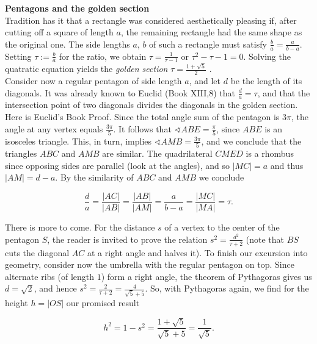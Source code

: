 \begin{mdframed}[nobreak=true, backgroundcolor=gray!15]
\vspace{8pt}
{\Large\textbf{Pentagons and the golden section}}\\
[5pt]
Tradition has it that a rectangle was considered aesthetically pleasing 
if, after cutting off a square of length $a$, the remaining rectangle had 
the same shape as the original one. The side lengths $a$, $b$  of such a
rectangle must satisfy $\frac{b}{a}= \frac{a}{b-a}$. Setting $\tau := \frac{b}{a}$
for the ratio, we obtain $\tau = \frac{1}{\tau-1}$ or $\tau^2 - \tau - 1 = 0$. Solving
the quatratic equation yields the \textit{golden section} $\tau = \frac{1 + \sqrt{5}}{2}$ .\\

Consider now a regular pentagon of side length $a$, and let $d$ be the 
length of its diagonals. It was already known to Euclid (Book XIII,8) 
that $\frac{d}{a} = \tau$, and that the intersection point of two diagonals divides 
the diagonals in the golden section.\\

Here is Euclid's Book Proof. Since the total angle sum of the pentagon 
is $3\pi$, the angle at any vertex equals $\frac{3\pi}{5}$. It follows that 
$\sphericalangle ABE = \frac{\pi}{5}$, since $ABE$ is an isosceles triangle. This, in turn, 
implies $\sphericalangle AMB = \frac{3\pi}{5}$, and we conclude that the triangles $ABC$ and 
$AMB$ are similar. The quadrilateral $CMED$  is a rhombus since opposing sides are
parallel (look at the angles), and so $|MC| = a$ and thus $|AM| = d - a$. By the similarity of 
$ABC$ and $AMB$ we conclude

\begin{equation*}
  \frac{d}{a} = \frac{|AC|}{|AB|} = \frac{|AB|}{|AM|} = \frac{a}{b-a} = \frac{|MC|}{|MA|} = \tau.
\end{equation*}

There is more to come. For the distance $s$ of a vertex to the center of 
the pentagon $S$,  the reader is invited to prove the relation $s^2 = \frac{d^2}{\tau + 2}$ 
(note that $BS$ cuts the diagonal $AC$ at a right angle and halves it). 
To finish our excursion into geometry, consider now the umbrella 
with the regular pentagon on top. Since alternate ribs (of length $1$) 
form a right angle, the theorem of Pythagoras gives us $d = \sqrt{2}$, and 
hence $s^2 = \frac{2}{\tau + 2} = \frac{4}{\sqrt{5} + 5}$. So, with Pythagoras again, 
we find for the height $h = |OS|$ our promised result

\begin{equation*}
  h^2 = 1 - s^2 = \frac{1+\sqrt{5}}{\sqrt{5}+5} = \frac{1}{\sqrt{5}}.
\end{equation*}

\vspace{5pt}

\end{mdframed}
